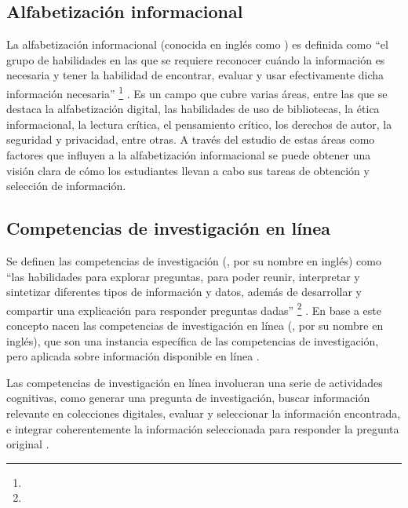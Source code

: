 \subsection{Alfabetización informacional}
\label{subsec:alfabetizacion}
La alfabetización informacional (conocida en inglés como ) es definida como “el grupo de habilidades en las que se requiere reconocer cuándo la información es necesaria y tener la habilidad de encontrar, evaluar y usar efectivamente dicha información necesaria” \footnote{\traduccionlibre} \parencite[p.~2]{american2000information}. Es un campo que cubre varias áreas, entre las que se destaca la alfabetización digital, las habilidades de uso de bibliotecas, la ética informacional, la lectura crítica, el pensamiento crítico, los derechos de autor, la seguridad y privacidad, entre otras. A través del estudio de estas áreas como factores que influyen a la alfabetización informacional se puede obtener una visión clara de cómo los estudiantes llevan a cabo sus tareas de obtención y selección de información.

\subsection{Competencias de investigación en línea}
\label{subsec:competencias}
Se definen las competencias de investigación (, por su nombre en inglés) como “las habilidades para explorar preguntas, para poder reunir, interpretar y sintetizar diferentes tipos de información y datos, además de desarrollar y compartir una explicación para responder preguntas dadas” \footnote{\traduccionlibre} \parencite[p.~13]{national2000inquiry}. En base a este concepto nacen las competencias de investigación en línea (, por su nombre en inglés), que son una instancia específica de las competencias de investigación, pero aplicada sobre información disponible en línea \parencite{quintana2005framework}.

Las competencias de investigación en línea involucran una serie de actividades cognitivas, como generar una pregunta de investigación, buscar información relevante en colecciones digitales, evaluar y seleccionar la información encontrada, e integrar coherentemente la información seleccionada para responder la pregunta original \parencite{eisenberg1990information}.

